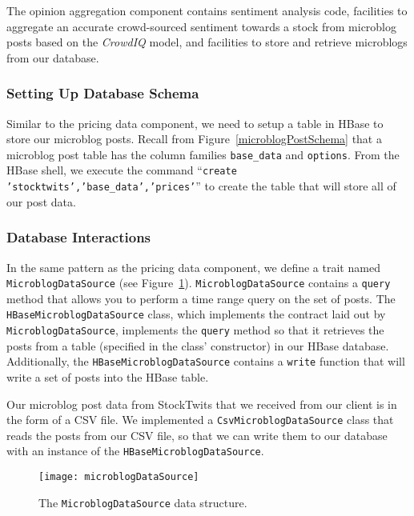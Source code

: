 The opinion aggregation component contains sentiment analysis code, facilities to aggregate an accurate crowd-sourced sentiment towards a stock from microblog posts based on the \textit{CrowdIQ} model, and facilities to store and retrieve microblogs from our database.

\subsubsection{Setting Up Database Schema}

Similar to the pricing data component, we need to setup a table in HBase to store our microblog posts.
Recall from Figure~\ref{microblogPostSchema} that a microblog post table has the column families \texttt{base\_data} and \texttt{options}.
From the HBase shell, we execute the command ``\texttt{create 'stocktwits','base\_data','prices'}'' to create the table that will store all of our post data.

\subsubsection{Database Interactions}

In the same pattern as the pricing data component, we define a trait named \texttt{MicroblogDataSource} (see Figure~\ref{microblogDataSource}).
\texttt{MicroblogDataSource} contains a \texttt{query} method that allows you to perform a time range query on the set of posts.
The \texttt{HBaseMicroblogDataSource} class, which implements the contract laid out by \texttt{MicroblogDataSource}, implements the \texttt{query} method so that it retrieves the posts from a table (specified in the class' constructor) in our HBase database.
Additionally, the \texttt{HBaseMicroblogDataSource} contains a \texttt{write} function that will write a set of posts into the HBase table.

Our microblog post data from StockTwits that we received from our client is in the form of a CSV file.
We implemented a \texttt{CsvMicroblogDataSource} class that reads the posts from our CSV file, so that we can write them to our database with an instance of the \texttt{HBaseMicroblogDataSource}.

\begin{figure}[h]
  \label{microblogDataSource}
  \begin{center}
    \texttt{[image: microblogDataSource]}
  \end{center}
  \caption{The \texttt{MicroblogDataSource} data structure.}
\end{figure}

